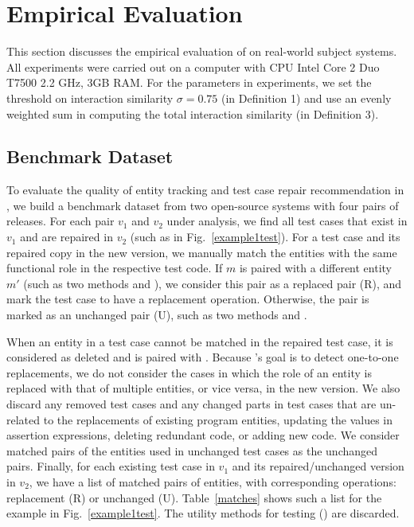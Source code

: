 \section{Empirical Evaluation}

This section discusses the empirical evaluation of {\tool} on
real-world subject systems. All experiments were carried out on a
computer with CPU Intel Core 2 Duo T7500 2.2 GHz, 3GB RAM. For the
parameters in experiments, we set the threshold on interaction
similarity $\sigma = 0.75$ (in Definition 1) and use an evenly weighted
sum in computing the total interaction similarity (in Definition 3).

\subsection{Benchmark Dataset}
To evaluate the quality of entity tracking and test case repair
recommendation in {\tool}, we build a benchmark dataset from two
open-source systems with four pairs of releases. For each pair $v_1$
and $v_2$ under analysis, we find all test cases that exist in $v_1$
and are repaired in $v_2$ (such as in
Fig.~\ref{example1test}). For a test case and its repaired copy in
the new version, we manually match the entities with the same
functional role in the respective test code. If $m$ is paired with a
different entity $m'$ (such as two methods
 and
), we consider this pair as
a replaced pair (R), and mark the test case to have a replacement
operation. Otherwise, the pair is marked as an unchanged pair (U), such as
two methods  and .

When an entity in a test case cannot be matched in the repaired test
case, it is considered as deleted and is paired with
. Because {\tool}'s goal is to detect one-to-one
replacements, we do not consider the cases in which the role of an
entity is replaced with that of multiple entities, or vice versa, in
the new version. We also discard any removed test cases and any
changed parts in test cases that are un-related to the replacements of
existing program entities, \eg updating the values in assertion
expressions, deleting redundant code, or adding new code. We consider
matched pairs of the entities used in unchanged test cases as the
unchanged pairs. Finally, for each existing test case in $v_1$ and its
repaired/unchanged version in $v_2$, we have a list of matched pairs of
entities, with corresponding operations: replacement (R) or unchanged
(U). Table~\ref{matches} shows such a list for the example in
Fig.~\ref{example1test}. The utility methods for testing
(\eg {}) are discarded.

